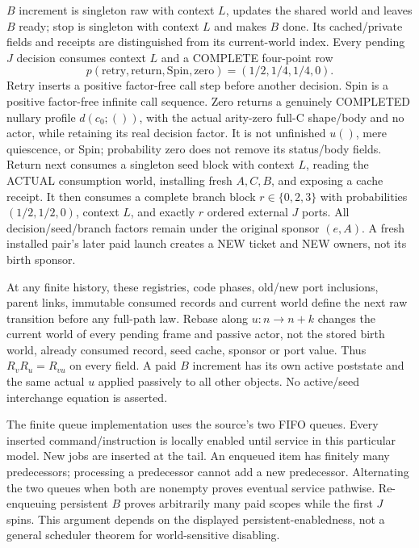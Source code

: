 \documentclass[11pt]{article}
\begin{document}
$B$ increment is singleton raw with context $L$, updates the shared world and leaves $B$ ready; stop is singleton with context $L$ and makes $B$ done. Its cached/private fields and receipts are distinguished from its current-world index. Every pending $J$ decision consumes context $L$ and a COMPLETE four-point row
\[
 p(\mathrm{retry},\mathrm{return},\mathrm{Spin},\mathrm{zero})=(1/2,1/4,1/4,0).
\]
Retry inserts a positive factor-free call step before another decision. Spin is a positive factor-free infinite call sequence. Zero returns a genuinely COMPLETED nullary profile $d(c_0;())$, with the actual arity-zero full-C shape/body and no actor, while retaining its real decision factor. It is not unfinished $u()$, mere quiescence, or Spin; probability zero does not remove its status/body fields. Return next consumes a singleton seed block with context $L$, reading the ACTUAL consumption world, installing fresh $A,C,B$, and exposing a cache receipt. It then consumes a complete branch block $r\in\{0,2,3\}$ with probabilities $(1/2,1/2,0)$, context $L$, and exactly $r$ ordered external $J$ ports. All decision/seed/branch factors remain under the original sponsor $(e,A)$. A fresh installed pair's later paid launch creates a NEW ticket and NEW owners, not its birth sponsor.

At any finite history, these registries, code phases, old/new port inclusions, parent links, immutable consumed records and current world define the next raw transition before any full-path law. Rebase along $u:n\to n+k$ changes the current world of every pending frame and passive actor, not the stored birth world, already consumed record, seed cache, sponsor or port value. Thus $R_vR_u=R_{vu}$ on every field. A paid $B$ increment has its own active poststate and the same actual $u$ applied passively to all other objects. No active/seed interchange equation is asserted.

The finite queue implementation uses the source's two FIFO queues. Every inserted command/instruction is locally enabled until service in this particular model. New jobs are inserted at the tail. An enqueued item has finitely many predecessors; processing a predecessor cannot add a new predecessor. Alternating the two queues when both are nonempty proves eventual service pathwise. Re-enqueuing persistent $B$ proves arbitrarily many paid scopes while the first $J$ spins. This argument depends on the displayed persistent-enabledness, not a general scheduler theorem for world-sensitive disabling.
\end{document}
